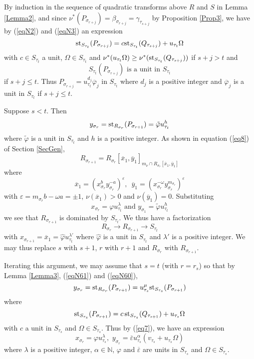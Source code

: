\documentclass[11pt]{amsart}
\def\NZQ{\mathbb}               %
\def\NN{{\NZQ N}}
\let\epsilon\varepsilon
\let\phi=\varphi
\begin{document}
By induction in the sequence of quadratic transforms above $R$ and $S$  in Lemma \ref{Lemma2}, and since $\nu^*(P_{\sigma_{r+j}})=\beta_{\sigma_{r+j}}=\gamma_{\tau_{s+j}}$ by Proposition \ref{Prop3}, we have by (\ref{eqN2}) and (\ref{eqN3}) an expression 
\begin{equation}\label{eqN60}
{\rm st}_{S_{\tau_t}}(P_{\sigma_{r+j}})=c{\rm st}_{S_{\tau_t}}(Q_{\tau_{s+j}})+u_{\tau_t}\Omega
\end{equation}
with $c\in S_{\tau_t}$ a unit, $\Omega\in S_{\tau_t}$ and $\nu^*(u_{\tau_t}\Omega)\ge\nu^*({\rm st}_{S_{\tau_t}}(Q_{\tau_{s+j}}))$ if $s+j>t$ and
\begin{equation}\label{eqN61}
S_{\tau_t}(P_{\sigma_{r+j}})\mbox{ is a unit in $S_{\tau_t}$}
\end{equation}
if $s+j\le t$.
Thus
$P_{\sigma_{r+j}}=u_{\tau_t}^{d_j}\overline\phi_j$ in $S_{\tau_t}$ where $d_j$ is a positive integer and $\overline\phi_j$ is a unit in $S_{\tau_t}$ if $s+j\le t$.

Suppose $s<t$. Then
$$
y_{\sigma_r}={\rm st}_{R_{\sigma_r}}(P_{\sigma_{r+1}})=\tilde\phi u_{\tau_t}^{h}
$$
where $\tilde\phi$ is a unit in $S_{\tau_{t}}$ and $h$ is a positive integer.
As shown in equation (\ref{eq8}) of Section \ref{SecGen},  
$$
R_{\sigma_{r+1}}=R_{\sigma_r}[\overline x_1,\overline y_1]_{m_{\nu}\cap R_{\sigma_r}[\overline x_1,\overline y_1]}
$$
 where
$$
\overline x_1=(x_{\sigma_r}^{b}y_{\sigma_r}^{-a})^{\epsilon},\,\,\, \overline y_1=(x_{\sigma_r}^{-\omega}y_{\sigma_r}^{m_{\sigma_r}})^{\epsilon}
$$
with $\epsilon=m_{\sigma_r}b-\omega a=\pm 1$,
$\nu(\overline x_1)>0$ and $\nu(\overline y_1)=0$. 
Substituting 
$$
x_{\sigma_r}=\phi u_{\tau_t}^{\lambda}\mbox{ and }y_{\sigma_1}=\tilde\phi u_{\tau_t}^h
$$
 we see that
$R_{\sigma_{r+1}}$ is dominated by $S_{\tau_t}$.
We thus have  a factorization
 $$
 R_{\sigma_r}\rightarrow R_{\sigma_{r+1}}\rightarrow S_{\tau_t}
 $$
with $x_{\sigma_{r+1}}=\overline x_1=\hat\phi u_{\tau_t}^{\lambda'}$ where $\hat\phi$ is a unit in $S_{\tau_t}$ and $\lambda'$ is a positive integer. We may thus replace $s$ with $s+1$, $r$ with $r+1$ and $R_{\sigma_r}$ with $R_{\sigma_{r+1}}$. 

Iterating this argument, we may assume that $s=t$ (with $r=r_s$) so that by Lemma \ref{Lemma3}, (\ref{eqN61}) and (\ref{eqN60}),
$$
y_{\sigma_r}={\rm st}_{R_{\sigma_r}}(P_{\sigma_{r+1}})=u_{\tau_s}^{\mu}{\rm st}_{S_{\tau_s}}(P_{\sigma_{r+1}})
$$
where 
$$
{\rm st}_{S_{\tau_s}}(P_{\sigma_{r+1}})=c\,{\rm st}_{S_{\tau_s}}(Q_{\tau_{s+1}})+u_{\tau_s}\Omega
$$
with $c$ a unit in $S_{\tau_s}$  and $\Omega\in S_{\tau_s}$. Thus by (\ref{eq7}), we have an expression
$$
x_{\sigma_r}= \phi u_{\tau_s}^{\lambda},\,\, y_{\sigma_r}=\overline\epsilon u_{\tau_s}^{\alpha}(v_{\tau_s}+u_{\tau_s}\Omega)
$$
where $\lambda$ is a positive integer, $\alpha\in \NN$, $\phi$ and $\overline\epsilon$ are units in $S_{\tau_s}$ and $\Omega\in S_{\tau_s}$.
\end{document}

